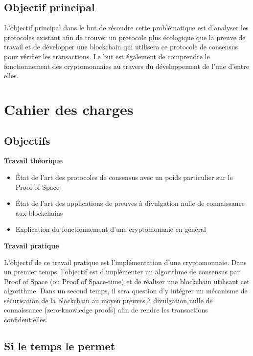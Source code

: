 \documentclass[../tb_report.tex]{subfiles}
\begin{document}
\subsection*{Objectif principal}

L'objectif principal dans le but de résoudre cette problématique est d'analyser les protocoles existant afin de trouver un protocole plus écologique que la preuve de travail et de développer une blockchain qui utilisera ce protocole de consensus pour vérifier les transactions. Le but est également de comprendre le fonctionnement des cryptomonnaies au travers du développement de l'une d'entre elles.


\section*{Cahier des charges}

\subsection*{Objectifs}

\textbf{Travail théorique}
\begin{itemize}
    \item État de l'art des protocoles de consensus avec un poids particulier sur le Proof of Space
    \item État de l'art des applications de preuves à divulgation nulle de connaissance aux blockchains
    \item Explication du fonctionnement d'une cryptomonnaie en général
\end{itemize}

\textbf{Travail pratique}

L'objectif de ce travail pratique est l'implémentation d'une cryptomonnaie.
Dans un premier temps, l'objectif est d'implémenter un algorithme de consensus par Proof of Space (ou Proof of Space-time) et de réaliser une blockchain utilisant cet algorithme.
Dans un second temps, il sera question d'y intégrer un mécanisme de sécurisation de la blockchain au moyen preuves à divulgation nulle de connaissance (zero-knowledge proofs) afin de rendre les transactions confidentielles.

\subsection*{Si le temps le permet}
\end{document}
